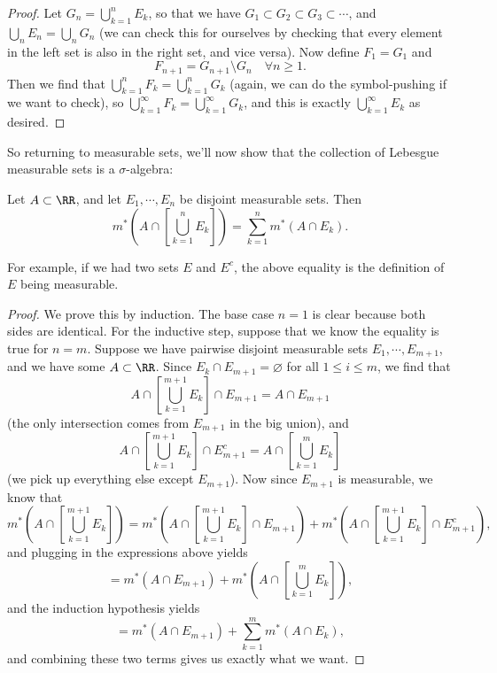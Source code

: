 \begin{proof}
Let $G_n = \bigcup_{k=1}^n E_k$, so that we have $G_1 \subset G_2 \subset G_3 \subset \cdots$, and $\bigcup_n E_n = \bigcup_n G_n$ (we can check this for ourselves by checking that every element in the left set is also in the right set, and vice versa). Now define $F_1 = G_1$ and
\[
    F_{n+1} = G_{n+1} \setminus G_n \quad \forall n \ge 1.
\]
Then we find that $\bigcup_{k=1}^n F_k = \bigcup_{k=1}^n G_k$ (again, we can do the symbol-pushing if we want to check), so $\bigcup_{k=1}^{\infty} F_k = \bigcup_{k=1}^{\infty} G_k$, and this is exactly $\bigcup_{k=1}^{\infty} E_k$ as desired.
\end{proof}

So returning to measurable sets, we'll now show that the collection of Lebesgue measurable sets is a $\sigma$-algebra:

\begin{proposition}\label{disjmeasprop}
Let $A \subset \RR$, and let $E_1, \cdots, E_n$ be disjoint measurable sets. Then 
\[
    m^\ast\left(A \cap \left[\bigcup_{k=1}^n E_k\right]\right) = \sum_{k=1}^n m^\ast(A \cap E_k).
\]
\end{proposition}

For example, if we had two sets $E$ and $E^c$, the above equality is the definition of $E$ being measurable.

\begin{proof}
We prove this by induction. The base case $n = 1$ is clear because both sides are identical. For the inductive step, suppose that we know the equality is true for $n = m$. Suppose we have pairwise disjoint measurable sets $E_1, \cdots, E_{m+1}$, and we have some $A \subset \RR$. Since $E_k \cap E_{m+1} = \varnothing$ for all $1 \le i \le m$, we find that 
\[
    A \cap \left[\bigcup_{k=1}^{m+1} E_k\right] \cap E_{m+1} = A \cap E_{m+1}
\]
(the only intersection comes from $E_{m+1}$ in the big union), and 
\[
    A \cap \left[\bigcup_{k=1}^{m+1} E_k\right] \cap E_{m+1}^c = A \cap \left[\bigcup_{k=1}^{m} E_k\right]
\]
(we pick up everything else except $E_{m+1}$). Now since $E_{m+1}$ is measurable, we know that
\[
    m^\ast\left(A \cap \left[\bigcup_{k=1}^{m+1} E_k\right]\right) = m^\ast\left(A \cap \left[\bigcup_{k=1}^{m+1} E_k\right] \cap E_{m+1}\right) + m^\ast\left(A \cap \left[\bigcup_{k=1}^{m+1} E_k\right] \cap E_{m+1}^c\right),
\]
and plugging in the expressions above yields 
\[
    = m^\ast(A \cap E_{m+1}) + m^\ast\left(A \cap \left[\bigcup_{k=1}^{m} E_k\right]\right),
\]
and the induction hypothesis yields 
\[
    = m^\ast(A \cap E_{m+1}) + \sum_{k=1}^m m^\ast(A \cap E_k),
\]
and combining these two terms gives us exactly what we want. 
\end{proof}

